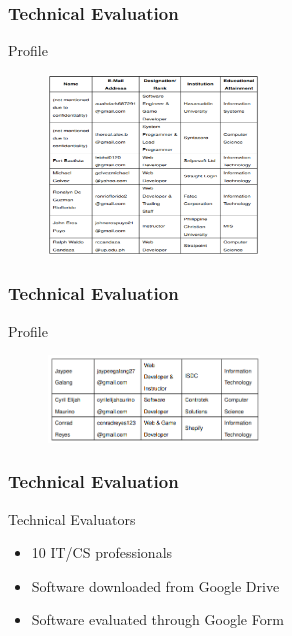 \documentclass{beamer}
\begin{document}
\begin{frame}
	\frametitle{Technical Evaluation}
	\begin{block}{Profile}
		\begin{figure}
			\includegraphics[width=0.5\textwidth]{figures/tech_profile.png}
		\end{figure}
	\end{block}
\end{frame}

\begin{frame}
	\frametitle{Technical Evaluation}
	\begin{block}{Profile}
		\begin{figure}
			\includegraphics[width=0.5\textwidth]{figures/tech_profile2.png}
		\end{figure}
	\end{block}
\end{frame}

\begin{frame}
	\frametitle{Technical Evaluation}
	\begin{block}{Technical Evaluators}
		\begin{itemize}
			\item<1-> 10 IT/CS professionals
			\item<2-> Software downloaded from Google Drive
			\item<3-> Software evaluated through Google Form
		\end{itemize}
	\end{block}
\end{frame}
\end{document}
